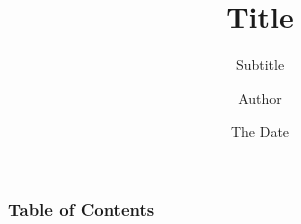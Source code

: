 \documentclass{beamer}
\title[Short Title]{Title}
\subtitle[Short Subtitle]{Subtitle}
\author[Short Author]{Author}
\institute[Short Institute]{Institute}
\date{The Date}
\begin{document}
	\begin{frame}
	\maketitle
	\end{frame}
	
	\begin{frame}
	\frametitle{Table of Contents}
	\tableofcontents
	\end{frame}
	
	
		
\end{document}
